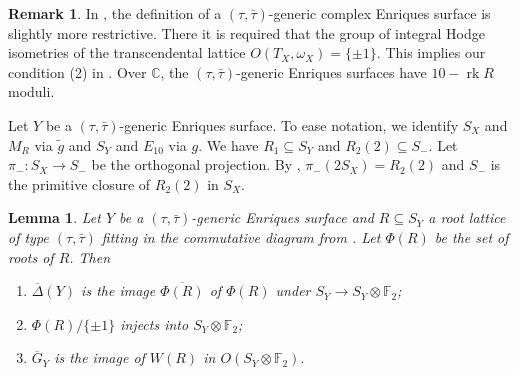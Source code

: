 \documentclass{amsart}
\theoremstyle{definition}
\newtheorem{remark}[definition]{Remark}
\theoremstyle{plain}
\newtheorem{lemma}[definition]{Lemma}
\DeclareMathOperator{\rk}{rk}
\newcommand{\FF}{\mathbb{F}}
\newcommand{\CC}{\mathbb{C}}
\newcommand{\Gbar}{\overline{G}}
\newcommand{\taubar}{\bar{\tau}}
\begin{document}
\begin{remark}
In \cite{brandhorst_shimada:tautaubar}, the definition of a $(\tau,\taubar)$-generic complex Enriques surface is slightly more restrictive. There it is required that the group of integral Hodge isometries of the transcendental lattice $O(T_X, \omega_X)=\{\pm 1\}$. This implies our condition (2) in .
Over $\CC$, the $(\tau,\taubar)$-generic Enriques surfaces have $10-\rk R$ moduli.
\end{remark}
Let $Y$ be a $(\tau,\taubar)$-generic Enriques surface. To ease notation,
we identify $S_X$ and $M_R$ via $\tilde{g}$ and $S_Y$ and $E_{10}$ via $g$.
We have $R_1 \subseteq S_Y$ and $R_2(2)\subseteq S_-$.
Let $\pi_-\colon S_X \to S_-$ be the orthogonal projection. By \cite[Lemma 3.5 (1)]{brandhorst_shimada:tautaubar}, $\pi_-(2S_X)=R_2(2)$ and $S_-$ is the primitive closure of $R_2(2)$ in $S_X$.
\begin{lemma}\label{lemma:tautaubar_delta_and_GbarY}
Let $Y$ be a $(\tau,\taubar)$-generic Enriques surface and $R \subseteq S_Y$ a root lattice of type
$(\tau,\taubar)$ fitting in the commutative diagram from .
Let $\Phi(R)$ be the set of roots of $R$. Then
\begin{enumerate}
    \item $\overline{\Delta}(Y)$ is the image $\overline{\Phi(R)}$ of $\Phi(R)$ under $S_Y \to S_Y \otimes \FF_2$;
    \item $\Phi(R)/\{\pm 1\}$ injects into $S_Y \otimes \FF_2$;
    \item $\Gbar_Y$ is the image of $W(R)$ in $O(S_Y\otimes \FF_2).$
\end{enumerate}
\end{lemma}
\end{document}
